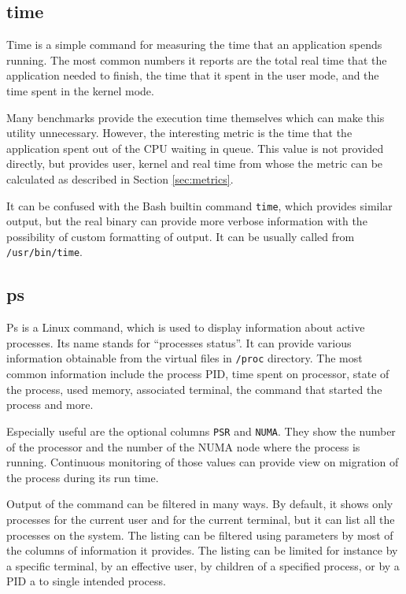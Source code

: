\subsection{time}
Time is a simple command for measuring the time that an application spends
running. The most common numbers it reports are the total real time that the
application needed to finish, the time that it spent in the user mode, and the
time spent in the kernel mode.

Many benchmarks provide the execution time themselves which can make this
utility unnecessary. However, the interesting metric is the time that the
application spent out of the CPU waiting in queue. This value is not provided
directly, but provides user, kernel and real time from whose the metric can be
calculated as described in Section \ref{sec:metrics}.

It can be confused with the Bash builtin command \texttt{time}, which provides similar
output, but the real binary can provide more verbose information with
the possibility of custom formatting of output. It can be usually called from
\texttt{/usr/bin/time}.

\subsection{ps}
Ps is a Linux command, which is used to display information about active processes. Its name
stands for ``processes status''. It can provide various information obtainable from
the virtual files in \texttt{/proc} directory. The most common information
include the process PID, time spent on processor, state of the process, used memory,
associated terminal, the command that started the process and more.

Especially useful are the optional columns \texttt{PSR} and \texttt{NUMA}. They
show the number of the processor and the number of the NUMA node where the process is
running. Continuous monitoring of those values can provide view on migration of
the process during its run time. 

Output of the command can be filtered in many ways. By default, it shows only
processes for the current user and for the current terminal, but it can list all
the processes on the system. The listing can be filtered using parameters by
most of the columns of information it provides. The listing can be limited for
instance by a specific terminal, by an effective user, by children of a specified process,
or by a PID a to single intended process.

